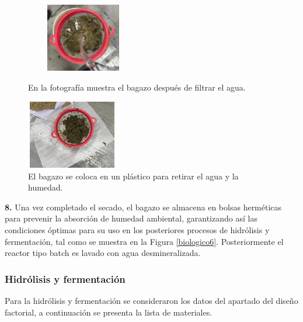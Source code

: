 \documentclass[12pt]{article}
\begin{document}
	
		\begin{figure}[H]
		\centering
		\begin{minipage}{0.46\textwidth}
			\centering
			\includegraphics[width=5cm, height=3cm]{imagenes/enjuagado} %
			\caption{En la fotografía muestra el bagazo después de filtrar el agua.}
			\label{enjuagado}
		\end{minipage}
		\hfill
		\begin{minipage}{0.48\textwidth}
			\centering
			\includegraphics[width=4cm, height=3cm]{imagenes/secado6} %
			\caption{El bagazo se coloca en un plástico para retirar el agua y la humedad.}
			\label{biologico4}
		\end{minipage}
	\end{figure}
	
	
	
	
	
	 \textbf{8.} Una vez completado el secado, el bagazo se almacena en bolsas herméticas para prevenir la absorción de humedad ambiental, garantizando así las condiciones óptimas para su uso en los posteriores procesos de hidrólisis y fermentación, tal como se muestra en la Figura \ref{biologico6}. Posteriormente el reactor tipo batch es lavado con agua desmineralizada.
	
	

			
				\subsubsection{Hidrólisis y fermentación}
				
			Para la hidrólisis y fermentación se consideraron los datos del apartado del diseño factorial, a continuación se presenta la lista de materiales.
			\\
					 
\end{document}
